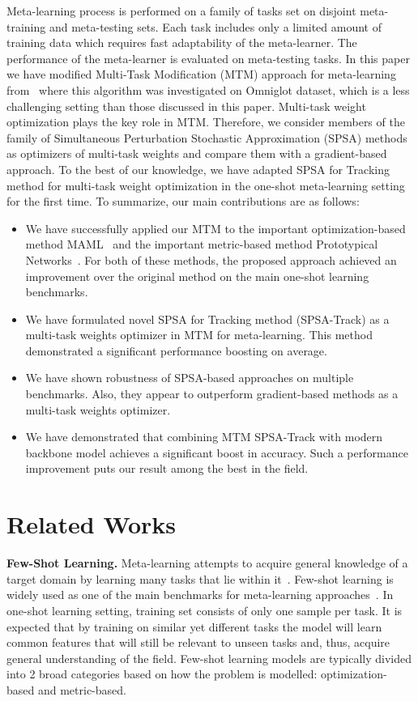 \documentclass{article}
\begin{document}
Meta-learning process is performed on a family of tasks set on disjoint meta-training and meta-testing sets. Each task includes only a limited amount of training data which requires fast adaptability of the meta-learner. The performance of the meta-learner is evaluated on meta-testing tasks. In this paper we have modified Multi-Task Modification (MTM) approach for meta-learning from~\cite{boiarov2020simultaneous} where this algorithm was investigated on Omniglot dataset, which is a less challenging setting than those discussed in this paper. Multi-task weight optimization plays the key role in MTM. Therefore, we consider members of the family of Simultaneous Perturbation Stochastic Approximation (SPSA) methods as optimizers of multi-task weights and compare them with a gradient-based approach. To the best of our knowledge, we have adapted SPSA for Tracking method for multi-task weight optimization in the one-shot meta-learning setting for the first time. To summarize, our main contributions are as follows:
\begin{itemize}
    \item We have successfully applied our MTM to the important optimization-based method MAML~\cite{finn2017model} and the important metric-based method Prototypical Networks~\cite{NIPS2017_cb8da676}. For both of these methods, the proposed approach achieved an improvement over the original method on the main one-shot learning benchmarks.
    \item We have formulated novel SPSA for Tracking method (SPSA-Track) as a multi-task weights optimizer in MTM for meta-learning. This method demonstrated a significant performance boosting on average.
    \item We have shown robustness of SPSA-based approaches on multiple benchmarks. Also, they appear to outperform gradient-based methods as a multi-task weights optimizer.
    \item We have demonstrated that combining MTM SPSA-Track with modern backbone model achieves a significant boost in accuracy. Such a performance improvement puts our result among the best in the field.
\end{itemize}

\section{Related Works}\label{sec:related_works}



{\bf Few-Shot Learning.} Meta-learning attempts to acquire general knowledge of a target domain by learning many tasks that lie within it~\cite{finn2017model}. Few-shot learning is widely used as one of the main benchmarks for meta-learning approaches~\cite{vinyals2016matching,finn2017model,tian2020rethinking}. In one-shot learning setting, training set consists of only one sample per task. It is expected that by training on similar yet different tasks the model will learn common features that will still be relevant to unseen tasks and, thus, acquire general understanding of the field. Few-shot learning models are typically divided into 2 broad categories based on how the problem is modelled: optimization-based and metric-based.
\end{document}

